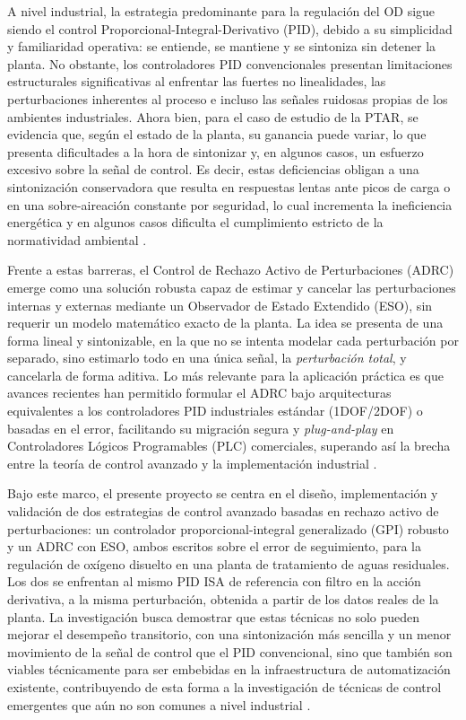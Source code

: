 A nivel industrial, la estrategia predominante para la regulación del OD sigue
siendo el control Proporcional-Integral-Derivativo (PID), debido a su
simplicidad y familiaridad operativa: se entiende, se mantiene y se sintoniza
sin detener la planta. No obstante, los controladores PID convencionales
presentan limitaciones estructurales significativas al enfrentar las fuertes no
linealidades, las perturbaciones inherentes al proceso e incluso las señales
ruidosas propias de los ambientes industriales. Ahora bien, para el caso de
estudio de la PTAR, se evidencia que, según el estado de la planta, su ganancia
puede variar, lo que presenta dificultades a la hora de sintonizar y, en
algunos casos, un esfuerzo excesivo sobre la señal de control. Es decir, estas
deficiencias obligan a una sintonización conservadora que resulta en respuestas
lentas ante picos de carga o en una sobre-aireación constante por seguridad, lo
cual incrementa la ineficiencia energética y en algunos casos dificulta el
cumplimiento estricto de la normatividad ambiental
\cite{iratni2019advances,qiao2016self}.

Frente a estas barreras, el Control de Rechazo Activo de Perturbaciones (ADRC)
emerge como una solución robusta capaz de estimar y cancelar las perturbaciones
internas y externas mediante un Observador de Estado Extendido (ESO), sin
requerir un modelo matemático exacto de la planta. La idea se presenta de una
forma lineal y sintonizable, en la que no se intenta modelar cada perturbación por separado, sino estimarlo
todo en una única señal, la \emph{perturbación total}, y cancelarla de forma
aditiva. Lo más relevante
para la aplicación práctica es que avances recientes han permitido formular el
ADRC bajo arquitecturas equivalentes a los controladores PID industriales
estándar (1DOF/2DOF) o basadas en el error, facilitando su migración segura y
\emph{plug-and-play} en Controladores Lógicos Programables (PLC) comerciales,
superando así la brecha entre la teoría de control avanzado y la
implementación industrial
\cite{gao2014centrality,stankovic2024pid,madonski2019general}.

Bajo este marco, el presente proyecto se centra en el diseño, implementación y
validación de dos estrategias de control avanzado basadas en rechazo activo de
perturbaciones: un controlador proporcional-integral generalizado (GPI) robusto y un
ADRC con ESO, ambos escritos sobre el error de seguimiento, para la regulación
de oxígeno disuelto en una planta de tratamiento de aguas residuales. Los dos
se enfrentan al mismo PID ISA de referencia con filtro en la acción derivativa,
a la misma perturbación, obtenida a partir de los datos reales de la planta. La investigación busca demostrar que estas técnicas no solo
pueden mejorar el desempeño transitorio, con una sintonización más sencilla y
un menor movimiento de la señal de control que el PID convencional, sino que también son viables técnicamente para ser embebidas en
la infraestructura de automatización existente, contribuyendo de esta forma a
la investigación de técnicas de
control emergentes que aún no son comunes a nivel industrial
\cite{wei2022scalable,Sangregorio2023}.

